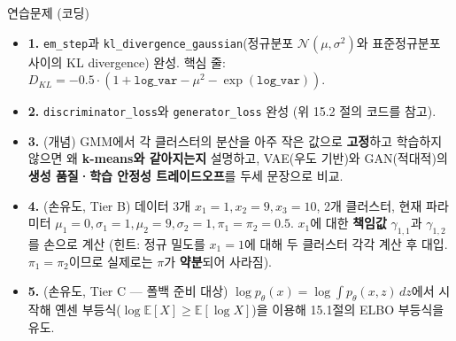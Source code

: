 \begin{frame}{연습문제 (코딩)}
  \begin{itemize}
    \item \textbf{1.} \texttt{em\_step}과
      \texttt{kl\_divergence\_gaussian}(정규분포
      $\mathcal{N}(\mu, \sigma^2)$와 표준정규분포 사이의 KL
      divergence) 완성. \; 핵심 줄:
      $D_{KL} = -0.5 \cdot (1 + \texttt{log\_var} - \mu^2
      - \exp(\texttt{log\_var}))$.
    \item \textbf{2.} \texttt{discriminator\_loss}와
      \texttt{generator\_loss} 완성 (위 15.2 절의 코드를 참고).
    \item \textbf{3.} (개념) GMM에서 각 클러스터의 분산을 아주
      작은 값으로 \textbf{고정}하고 학습하지 않으면 왜
      \textbf{k-means와 같아지는지} 설명하고, VAE(우도 기반)와
      GAN(적대적)의 \textbf{생성 품질·학습 안정성 트레이드오프}를
      두세 문장으로 비교.
    \item \textbf{4.} (손유도, Tier B) 데이터 3개
      $x_1 = 1, x_2 = 9, x_3 = 10$, 2개 클러스터, 현재 파라미터
      $\mu_1 = 0, \sigma_1 = 1, \mu_2 = 9, \sigma_2 = 1,
      \pi_1 = \pi_2 = 0.5$. $x_1$에 대한 \textbf{책임값}
      $\gamma_{1,1}$과 $\gamma_{1,2}$를 손으로 계산 (힌트: 정규
      밀도를 $x_1 = 1$에 대해 두 클러스터 각각 계산 후 대입.
      $\pi_1 = \pi_2$이므로 실제로는 $\pi$가 \textbf{약분}되어
      사라짐).
    \item \textbf{5.} (손유도, Tier C — 폴백 준비 대상)
      $\log p_\theta(x) = \log \int p_\theta(x,z)\,dz$에서 시작해
      옌센 부등식($\log \mathbb{E}[X] \ge \mathbb{E}[\log X]$)을
      이용해 15.1절의 ELBO 부등식을 유도.
  \end{itemize}
\end{frame}
